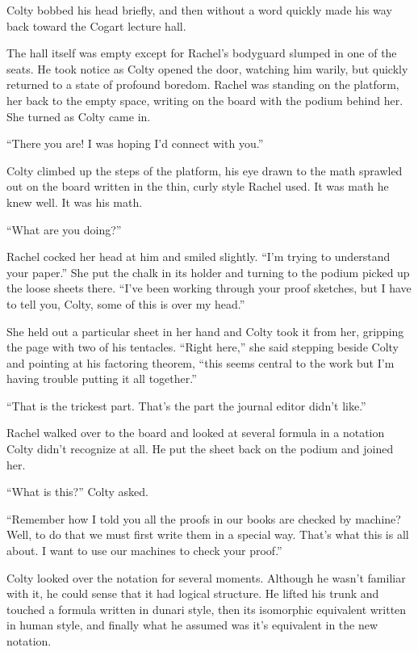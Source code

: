Colty bobbed his head briefly, and then without a word quickly made his way back toward the
Cogart lecture hall.

The hall itself was empty except for Rachel's bodyguard slumped in one of the seats. He took
notice as Colty opened the door, watching him warily, but quickly returned to a state of
profound boredom. Rachel was standing on the platform, her back to the empty space, writing on
the board with the podium behind her. She turned as Colty came in.

``There you are! I was hoping I'd connect with you.''

Colty climbed up the steps of the platform, his eye drawn to the math sprawled out on the board
written in the thin, curly style Rachel used. It was math he knew well. It was his math.

``What are you doing?''

Rachel cocked her head at him and smiled slightly. ``I'm trying to understand your paper.'' She
put the chalk in its holder and turning to the podium picked up the loose sheets there. ``I've
been working through your proof sketches, but I have to tell you, Colty, some of this is over my
head.''

She held out a particular sheet in her hand and Colty took it from her, gripping the page with
two of his tentacles. ``Right here,'' she said stepping beside Colty and pointing at his
factoring theorem, ``this seems central to the work but I'm having trouble putting it all
together.''

``That is the trickest part. That's the part the journal editor didn't like.''

Rachel walked over to the board and looked at several formula in a notation Colty didn't
recognize at all. He put the sheet back on the podium and joined her.

``What is this?'' Colty asked.

``Remember how I told you all the proofs in our books are checked by machine? Well, to do that
we must first write them in a special way. That's what this is all about. I want to use our
machines to check your proof.''

Colty looked over the notation for several moments. Although he wasn't familiar with it, he
could sense that it had logical structure. He lifted his trunk and touched a formula written in
dunari style, then its isomorphic equivalent written in human style, and finally what he assumed
was it's equivalent in the new notation.

